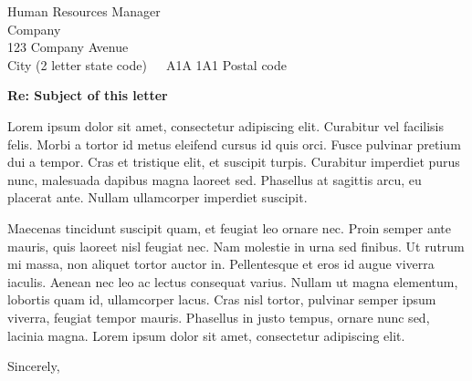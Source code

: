\documentclass[12pt]{letter}
\begin{document}
\begin{letter}{
    Human Resources Manager \\
    Company \\
    123 Company Avenue \\
    City (2 letter state code)\ \ \ A1A 1A1 Postal code}

  \opening{\textbf{Re: Subject of this letter}}

  Lorem ipsum dolor sit amet, consectetur adipiscing elit. Curabitur vel facilisis felis. Morbi a tortor id metus eleifend cursus id quis orci. Fusce pulvinar pretium dui a tempor. Cras et tristique elit, et suscipit turpis. Curabitur imperdiet purus nunc, malesuada dapibus magna laoreet sed. Phasellus at sagittis arcu, eu placerat ante. Nullam ullamcorper imperdiet suscipit.

  Maecenas tincidunt suscipit quam, et feugiat leo ornare nec. Proin semper ante mauris, quis laoreet nisl feugiat nec. Nam molestie in urna sed finibus. Ut rutrum mi massa, non aliquet tortor auctor in. Pellentesque et eros id augue viverra iaculis. Aenean nec leo ac lectus consequat varius. Nullam ut magna elementum, lobortis quam id, ullamcorper lacus. Cras nisl tortor, pulvinar semper ipsum viverra, feugiat tempor mauris. Phasellus in justo tempus, ornare nunc sed, lacinia magna. Lorem ipsum dolor sit amet, consectetur adipiscing elit. 

  \closing{Sincerely,}

\end{letter}
\end{document}
